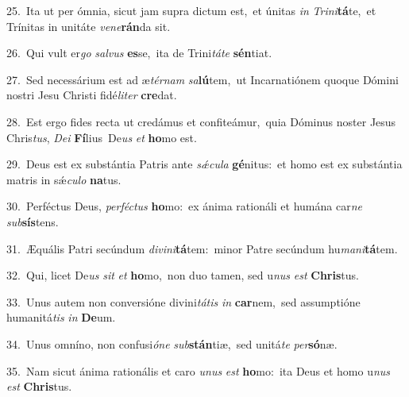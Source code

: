 {\numbfont\textcolor{\numbcolor}{25.}}~Ita ut per ómnia, sicut jam supra dictum est,~\dagger et únitas \textit{in} \textit{Tri}\-\textit{ni}\textbf{tá}te,~\star et Trínitas in unitáte \textit{ve}\-\textit{ne}\textbf{rán}da sit.\par
{\numbfont\textcolor{\numbcolor}{26.}}~Qui vult er\textit{go} \textit{sal}\-\textit{vus} \textbf{es}\-se,~\star ita de Trini\-\textit{tá}\-\textit{te} \textbf{sén}\-tiat.\par
{\numbfont\textcolor{\numbcolor}{27.}}~Sed necessárium est ad æ\-\textit{tér}\-\textit{nam} \textit{sa}\-\textbf{lú}tem,~\star ut Incarnatiónem quoque Dómini nostri Jesu Christi fidé\-\textit{li}\-\textit{ter} \textbf{cre}\-dat.\par
{\numbfont\textcolor{\numbcolor}{28.}}~Est ergo fides recta ut credámus et confiteámur,~\dagger quia Dóminus noster Jesus Chris\-\textit{tus}\-, \textit{De}\-\textit{i} \textbf{Fí}\-lius~\star De\textit{us} \textit{et} \textbf{ho}\-mo est.\par
{\numbfont\textcolor{\numbcolor}{29.}}~Deus est ex substántia Patris ante \textit{sǽ}\-\textit{cu}\textit{la} \textbf{gé}\-nitus:~\star et homo est ex substántia matris in sǽ\-\textit{cu}\-\textit{lo} \textbf{na}\-tus.\par
{\numbfont\textcolor{\numbcolor}{30.}}~Perféctus Deus, \textit{per}\-\textit{féc}\textit{tus} \textbf{ho}\-mo:~\star ex ánima rationáli et humána car\textit{ne} \textit{sub}\-\textbf{sís}tens.\par
{\numbfont\textcolor{\numbcolor}{31.}}~Æquális Patri secúndum \textit{di}\-\textit{vi}\textit{ni}\textbf{tá}tem:~\star minor Patre secúndum hu\-\textit{ma}\-\textit{ni}\textbf{tá}tem.\par
{\numbfont\textcolor{\numbcolor}{32.}}~Qui, licet De\textit{us} \textit{sit} \textit{et} \textbf{ho}\-mo,~\star non duo tamen, sed u\textit{nus} \textit{est} \textbf{Chris}\-tus.\par
{\numbfont\textcolor{\numbcolor}{33.}}~Unus autem non conversióne divini\-\textit{tá}\-\textit{tis} \textit{in} \textbf{car}\-nem,~\star sed assumptióne humanitá\textit{tis} \textit{in} \textbf{De}\-um.\par
{\numbfont\textcolor{\numbcolor}{34.}}~Unus omníno, non confusi\-\textit{ó}\-\textit{ne} \textit{sub}\-\textbf{stán}tiæ,~\star sed unitá\textit{te} \textit{per}\-\textbf{só}næ.\par
{\numbfont\textcolor{\numbcolor}{35.}}~Nam sicut ánima rationális et caro \textit{u}\-\textit{nus} \textit{est} \textbf{ho}\-mo:~\star ita Deus et homo u\textit{nus} \textit{est} \textbf{Chris}\-tus.\par
